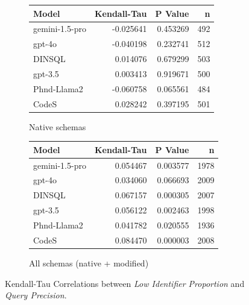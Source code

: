 \begin{figure}
  \centering
  \begin{subfigure}{.5\linewidth}
      \centering
      \begin{tabular}{lrrr}
\toprule
Model & Kendall-Tau & P Value & n \\
\midrule
gemini-1.5-pro & -0.025641 & 0.453269 & 492 \\
gpt-4o & -0.040198 & 0.232741 & 512 \\
DINSQL & 0.014076 & 0.679299 & 503 \\
gpt-3.5 & 0.003413 & 0.919671 & 500 \\
Phnd-Llama2 & -0.060758 & 0.065561 & 484 \\
CodeS & 0.028242 & 0.397195 & 501 \\
\bottomrule
\end{tabular}

      \caption{Native schemas}
      \label{table:natmedium-precision-ktau-native}
  \end{subfigure}%
  \begin{subfigure}{.5\linewidth}
      \centering
      \begin{tabular}{lrrr}
\toprule
Model & Kendall-Tau & P Value & n \\
\midrule
gemini-1.5-pro & 0.054467 & 0.003577 & 1978 \\
gpt-4o & 0.034060 & 0.066693 & 2009 \\
DINSQL & 0.067157 & 0.000305 & 2007 \\
gpt-3.5 & 0.056122 & 0.002463 & 1998 \\
Phnd-Llama2 & 0.041782 & 0.020555 & 1936 \\
CodeS & 0.084470 & 0.000003 & 2008 \\
\bottomrule
\end{tabular}

      \caption{All schemas (native + modified)}
      \label{table:natmedium-precision-ktau-all}
  \end{subfigure}
  \caption{Kendall-Tau Correlations between \emph{Low Identifier Proportion} and \emph{Query Precision}.}
\end{figure}

